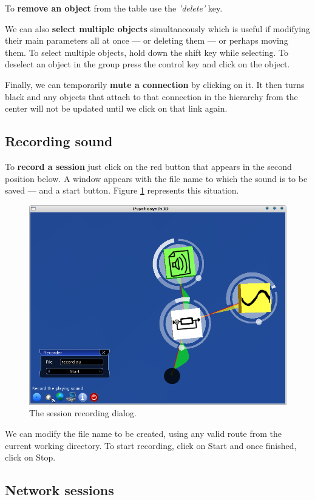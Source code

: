 To \textbf{remove an object} from the table use the \emph{'delete'} key.

We can also \textbf{select multiple objects} simultaneously which is
useful if modifying their main parameters all at once --- or deleting
them --- or perhaps moving them. To select multiple objects, hold down
the shift key while selecting. To deselect an object in the group
press the control key and click on the object.

Finally, we can temporarily \textbf{mute a connection} by clicking on
it. It then turns black and any objects that attach to that connection
in the hierarchy from the center will not be updated until we click on
that link again.

\subsection{Recording sound}

To \textbf{record a session} just click on the red button that appears
in the second position below. A window appears with the file name to
which the sound is to be saved --- and a start button. Figure
\ref{fig:userman-3} represents this situation.

\begin{figure}[h!]
  \centering
  \includegraphics[width=.7\textwidth]{pic/userman-3.png}
  \caption{The session recording dialog.}
  \label{fig:userman-3}
\end{figure}

We can modify the file name to be created, using any valid route from
the current working directory. To start recording, click on Start and
once finished, click on Stop.

\subsection{Network sessions}

